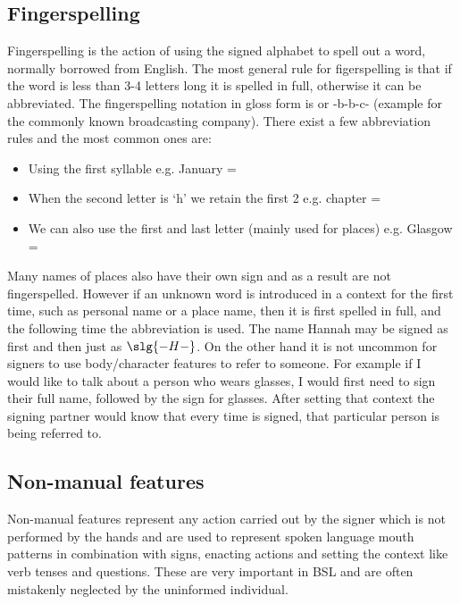 \documentclass[12pt]{ociamthesis}  %
\begin{document}
\subsection{Fingerspelling}
\label{fingerspelling}
Fingerspelling is the action of using the signed alphabet to spell out a word, normally borrowed from English. The most general rule for figerspelling is that if the word is less than 3-4 letters long it is spelled in full, otherwise it can be abbreviated. The fingerspelling notation in gloss form is  or -b-b-c- (example for the commonly known broadcasting company). There exist a few abbreviation rules and the most common ones are:
\begin{itemize}
	\item Using the first syllable e.g. January = 
	\item When the second letter is `h' we retain the first 2 e.g. chapter = 
	\item We can also use the first and last letter (mainly used for places) e.g. Glasgow = 
\end{itemize}
Many names of places also have their own sign and as a result are not fingerspelled. However if an unknown word is introduced in a context for the first time, such as personal name or a place name, then it is first spelled in full, and the following time the abbreviation is used. The name Hannah may be signed as  first and then just as $\slg{-H-}$. On the other hand it is not uncommon for signers to use body/character features to refer to someone. For example if I would like to talk about a person who wears glasses, I would first need to sign their full name, followed by the sign for glasses. After setting that context the signing partner would know that every time  is signed, that  particular person is being referred to.

\subsection{Non-manual features}
\label{non-man}
Non-manual features represent any action carried out by the signer which is not performed by the hands and are used to represent spoken language mouth patterns in combination with signs, enacting actions and setting the context like verb tenses and questions. These are very important in BSL and are often mistakenly neglected by the uninformed individual.
\end{document}
